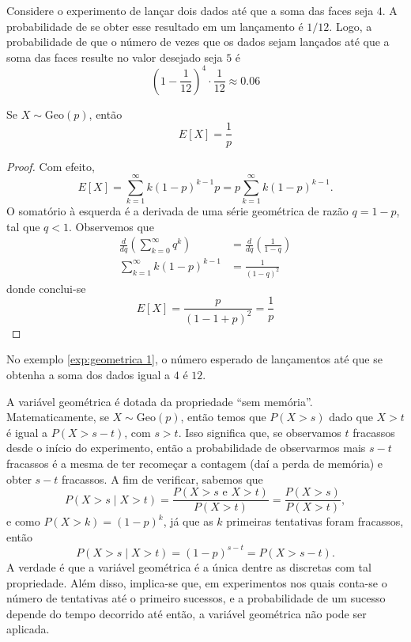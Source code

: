\begin{exp:geometrica 1}
\label{exp:geometrica 1}
Considere o experimento de lançar dois dados até que a soma das faces seja $4$.
A probabilidade de se obter esse resultado em um lançamento é $1/12$.
Logo, a probabilidade de que o número de vezes que os dados sejam lançados até que
a soma das faces resulte no valor desejado seja $5$ é
\[
    \left(1-\frac{1}{12}\right)^4 \cdot \frac{1}{12} \approx 0.06
\]
\end{exp:geometrica 1}

\begin{prop:esperanca geometrica}
Se $X \sim \mathrm{Geo}(p)$, então
\[
	E[X] = \frac{1}{p}
\]
\end{prop:esperanca geometrica}
\begin{proof}
	Com efeito,
	\[
		E[X] = \sum_{k=1}^\infty k (1-p)^{k-1} p = p \sum_{k=1}^\infty k(1-p)^{k-1}.
	\]
	O somatório à esquerda é a derivada de uma série geométrica de razão $q = 1-p$,
	tal que $q < 1$. Observemos que
	\begin{align*}
		\frac{d}{dq} \left(\sum_{k=0}^\infty q^k\right) & =
		\frac{d}{dq} \left(\frac{1}{1 - q}\right)                             \\
		\sum_{k=1}^\infty k(1-p)^{k-1}                  & = \frac{1}{(1-q)^2}
	\end{align*}
	donde conclui-se
	\[
		E[X] = \frac{p}{(1 - 1 + p)^2} = \frac{1}{p}
	\]
\end{proof}

\begin{exp:esperanca geometrica 1}
No exemplo \ref{exp:geometrica 1}, o número esperado de lançamentos até que se obtenha
a soma dos dados igual a $4$ é $12$.
\end{exp:esperanca geometrica 1}

\begin{obs:geometrica 1}
A variável geométrica é dotada da propriedade ``sem memória''.
Matematicamente, se $X \sim \mathrm{Geo}(p)$, então temos que $P(X > s)$ dado que
$X > t$ é igual a $P(X > s - t)$, com $s > t$.
Isso significa que, se observamos $t$ fracassos desde o início do experimento,
então a probabilidade de observarmos mais $s-t$ fracassos é a mesma de ter
recomeçar a contagem (daí a perda de memória) e obter $s-t$ fracassos.
A fim de verificar, sabemos que
\[
    P(X > s \mid X > t) = \frac{P(X > s \text{ e } X > t)}{P(X > t)} = \frac{P(X >s)}{P(X >t)},
\]
e como $P(X > k) = (1-p)^k$, já que as $k$ primeiras tentativas foram fracassos,
então
\[
    P(X > s \mid X > t) = (1-p)^{s-t} = P(X > s-t).
\]
A verdade é que a variável geométrica é a única dentre as discretas com tal propriedade.
Além disso, implica-se que, em experimentos nos quais conta-se o número de tentativas até o
primeiro sucessos, e a probabilidade de um sucesso depende do tempo decorrido
até então, a variável geométrica não pode ser aplicada.
\end{obs:geometrica 1}

